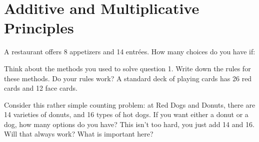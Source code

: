 \documentclass[12pt]{article}
\begin{document}
\section{Additive and Multiplicative Principles}

\begin{activity}
\begin{questions}
\question A restaurant offers 8 appetizers and 14 entr\'ees.  How many choices do you have if:
\question Think about the methods you used to solve question 1.  Write down the rules for these methods.
\question Do your rules work?  A standard deck of playing cards has 26 red cards and 12 face cards.

\end{questions}

\end{activity}


Consider this rather simple counting problem: at Red Dogs and Donuts, there are 14 varieties of donuts, and 16 types of hot dogs.  If you want either a donut or a dog, how many options do you have?  This isn't too hard, you just add 14 and 16.  Will that always work?  What is important here?
\end{document}
